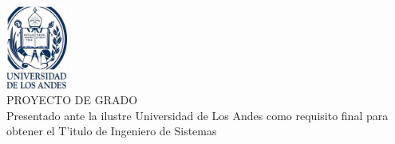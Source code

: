 \begin{center}
\TitleBlock[\bigskip]{}
\includegraphics[width=0.15\textwidth]{images/logoULA.jpg}
\\[5mm]PROYECTO DE GRADO
\\[1cm]Presentado ante la ilustre Universidad de Los Andes como requisito final para obtener el T'itulo de Ingeniero de Sistemas
\end{center}
 

\begin{titlepage}
   
  \vspace*{0.50in}
  
 	\TitleBlock{\normalsize\scshape\inserttitle}
\end{titlepage}

